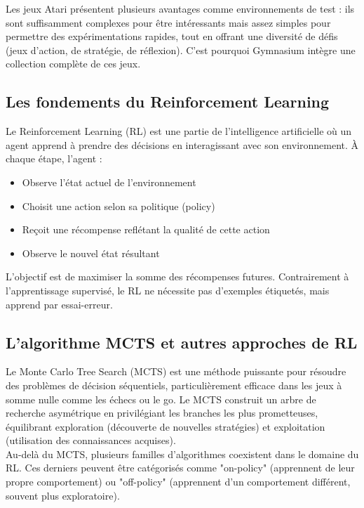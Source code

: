 \documentclass{article}
\begin{document}
Les jeux Atari présentent plusieurs avantages comme environnements de test : ils sont suffisamment complexes pour être intéressants mais assez simples pour permettre des expérimentations rapides, tout en offrant une diversité de défis (jeux d'action, de stratégie, de réflexion). C'est pourquoi Gymnasium intègre une collection complète de ces jeux.

\subsection{Les fondements du Reinforcement Learning}

\quad Le Reinforcement Learning (RL) est une partie de l’intelligence artificielle où un agent apprend à prendre des décisions en interagissant avec son environnement. À chaque étape, l'agent : 
\begin{itemize} 
    \item Observe l'état actuel de l'environnement
    \item Choisit une action selon sa politique (policy)
    \item Reçoit une récompense reflétant la qualité de cette action
    \item Observe le nouvel état résultant
\end{itemize}

\quad L'objectif est de maximiser la somme des récompenses futures. Contrairement à l'apprentissage supervisé, le RL ne nécessite pas d'exemples étiquetés, mais apprend par essai-erreur.

\subsection{L'algorithme MCTS et autres approches de RL}

\quad Le Monte Carlo Tree Search (MCTS) est une méthode puissante pour résoudre des problèmes de décision séquentiels, particulièrement efficace dans les jeux à somme nulle comme les échecs ou le go. Le MCTS construit un arbre de recherche asymétrique en privilégiant les branches les plus prometteuses, équilibrant exploration (découverte de nouvelles stratégies) et exploitation (utilisation des connaissances acquises).\\

Au-delà du MCTS, plusieurs familles d'algorithmes coexistent dans le domaine du RL. Ces derniers peuvent être catégorisés  comme "on-policy" (apprennent de leur propre comportement) ou "off-policy" (apprennent d'un comportement différent, souvent plus exploratoire).\\
\end{document}
